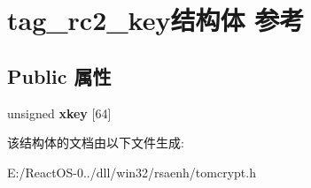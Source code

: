 \hypertarget{structtag__rc2__key}{}\section{tag\+\_\+rc2\+\_\+key结构体 参考}
\label{structtag__rc2__key}
\subsection*{Public 属性}
\begin{DoxyCompactItemize}
\item 
\mbox{\label{structtag__rc2__key_a9b2a1833bd3add0f59977fd67050fa14}} 
unsigned {\bfseries xkey} \mbox{[}64\mbox{]}
\end{DoxyCompactItemize}


该结构体的文档由以下文件生成\+:\begin{DoxyCompactItemize}
\item 
E\+:/\+React\+O\+S-\/0../dll/win32/rsaenh/tomcrypt.\+h\end{DoxyCompactItemize}
